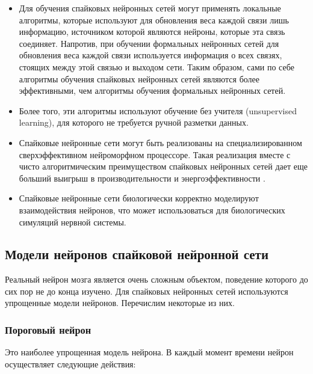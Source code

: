 \documentclass[a4paper]{article}
\begin{document}
\begin{itemize}
\item Для обучения спайковых нейронных сетей могут применять локальные алгоритмы, которые используют для обновления веса каждой связи лишь информацию, источником которой являются нейроны, которые эта связь соединяет. Напротив, при обучении формальных нейронных сетей для обновления веса каждой связи используется информация о всех связях, стоящих между этой связью и выходом сети. Таким образом, сами по себе алгоритмы обучения спайковых нейронных сетей являются более эффективными, чем алгоритмы обучения формальных нейронных сетей.
\item Более того, эти алгоритмы используют обучение без учителя (unsupervised learning), для которого не требуется ручной разметки данных.
\item Спайковые нейронные сети могут быть реализованы на специализированном сверхэффективном нейроморфном процессоре. Такая реализация вместе с чисто алгоритмическим преимуществом спайковых нейронных сетей дает еще больший выигрыш в производительности и энергоэффективности \cite{hardware1} \cite{hardware2}. 
\item Спайковые нейронные сети биологически корректно моделируют взаимодействия нейронов, что может использоваться для биологических симуляций нервной системы.
\end{itemize}

\subsection{Модели нейронов спайковой нейронной сети}
Реальный нейрон мозга является очень сложным объектом, поведение которого до сих пор не до конца изучено. Для спайковых нейронных сетей используются упрощенные модели нейронов. Перечислим некоторые из них.

\subsubsection{Пороговый нейрон}
Это наиболее упрощенная модель нейрона. В каждый момент времени нейрон осуществляет следующие действия:
\end{document}

